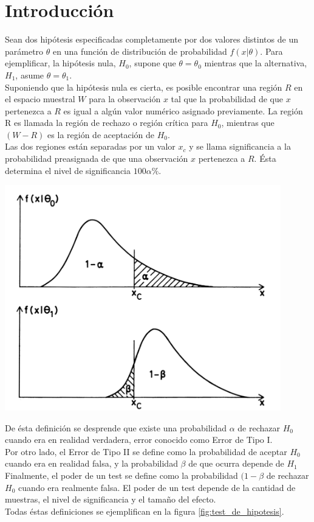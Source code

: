 \documentclass[%
 reprint,
 amsmath,amssymb,
 aps,
spanish]{revtex4-1}
\begin{document}
\section{Introducción}
Sean dos hipótesis especificadas completamente por dos valores distintos de un parámetro $\theta$ en una función de distribución de probabilidad $f(x|\theta)$. 
Para ejemplificar, la hipótesis nula, $H_0$, supone que $\theta = \theta_0$ mientras que la alternativa, $H_1$, asume $\theta = \theta_1$. \\
Suponiendo que la hipótesis nula es cierta, es posible encontrar una región $R$ en el espacio muestral $W$ para la observación $x$ tal que la probabilidad de que $x$ pertenezca a $R$ es igual a algún 
valor numérico asignado previamente. La región R es llamada la región de rechazo o región crítica para $H_0$, mientras que $(W-R)$ es la región de aceptación de $H_0$.\\
Las dos regiones están separadas por un valor $x_c$ y se llama significancia a la probabilidad preasignada de que una observación $x$ pertenezca a $R$. Ésta determina el nivel de significancia 
$100\alpha\%$.\\
\begin{minipage}{0.45\textwidth}									
\centering
\includegraphics[width=0.9\textwidth]{imagenes/test_de_hipotesis}
\label{fig:test_de_hipotesis}
\end{minipage}

De ésta definición se desprende que existe una probabilidad $\alpha$ de rechazar $H_0$ cuando era en realidad verdadera, error conocido como Error de Tipo I.\\
Por otro lado, el Error de Tipo II se define como la probabilidad de aceptar $H_0$ cuando era en realidad falsa, y la probabilidad $\beta$ de que ocurra depende de $H_1$\\
Finalmente, el poder de un test se define como la probabilidad $(1-\beta$ de rechazar $H_0$ cuando era realmente falsa. El poder de un test depende de la cantidad de muestras, el nivel de 
significancia y el tamaño del efecto. \\ Todas éstas definiciones se ejemplifican en la figura \ref{fig:test_de_hipotesis}.\cite{frodesen}
\end{document}
